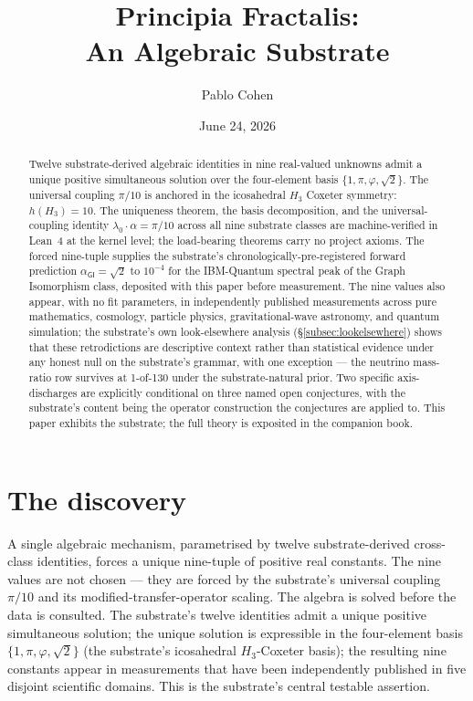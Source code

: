\documentclass[11pt,a4paper]{amsart}
\title{Principia Fractalis:\\ An Algebraic Substrate}
\author{Pablo Cohen}
\date{June 24, 2026}
\theoremstyle{plain}
\theoremstyle{definition}
\begin{document}
\maketitle

\begin{abstract}
Twelve substrate-derived algebraic identities in nine real-valued unknowns admit a unique positive simultaneous solution over the four-element basis $\{1,\pi,\varphi,\sqrt{2}\}$. The universal coupling $\pi/10$ is anchored in the icosahedral $H_3$ Coxeter symmetry: $h(H_3) = 10$. The uniqueness theorem, the basis decomposition, and the universal-coupling identity $\lambda_0 \cdot \alpha = \pi/10$ across all nine substrate classes are machine-verified in Lean~4 at the kernel level; the load-bearing theorems carry no project axioms. The forced nine-tuple supplies the substrate's chronologically-pre-registered forward prediction $\alpha_{\textsf{GI}} = \sqrt{2}$ to $10^{-4}$ for the IBM-Quantum spectral peak of the Graph Isomorphism class, deposited with this paper before measurement. The nine values also appear, with no fit parameters, in independently published measurements across pure mathematics, cosmology, particle physics, gravitational-wave astronomy, and quantum simulation; the substrate's own look-elsewhere analysis (\S\ref{subsec:lookelsewhere}) shows that these retrodictions are descriptive context rather than statistical evidence under any honest null on the substrate's grammar, with one exception --- the neutrino mass-ratio row survives at 1-of-130 under the substrate-natural prior. Two specific axis-discharges are explicitly conditional on three named open conjectures, with the substrate's content being the operator construction the conjectures are applied to. This paper exhibits the substrate; the full theory is exposited in the companion book.
\end{abstract}

\section{The discovery}

A single algebraic mechanism, parametrised by twelve substrate-derived cross-class identities, forces a unique nine-tuple of positive real constants. The nine values are not chosen --- they are forced by the substrate's universal coupling $\pi/10$ and its modified-transfer-operator scaling. The algebra is solved before the data is consulted. The substrate's twelve identities admit a unique positive simultaneous solution; the unique solution is expressible in the four-element basis $\{1,\pi,\varphi,\sqrt{2}\}$ (the substrate's icosahedral $H_3$-Coxeter basis); the resulting nine constants appear in measurements that have been independently published in five disjoint scientific domains. This is the substrate's central testable assertion.
\end{document}
